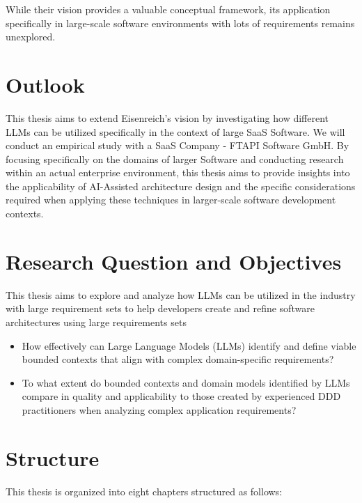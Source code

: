 While their vision provides a valuable conceptual framework, its application specifically in large-scale software environments with lots of requirements remains unexplored. 

\section{Outlook}
This thesis aims to extend Eisenreich's vision by investigating how different LLMs can be utilized specifically in the context of large SaaS Software. We will conduct an empirical study with a SaaS Company - FTAPI Software GmbH. By focusing specifically on the domains of larger Software and conducting research within an actual enterprise environment, this thesis aims to provide insights into the applicability of AI-Assisted architecture design and the specific considerations required when applying these techniques in larger-scale software development contexts.

\section{Research Question and Objectives}

This thesis aims to explore and analyze how LLMs can be utilized in the industry with large requirement sets to help developers create and refine software architectures using large requirements sets

\begin{itemize}
    \item How effectively can Large Language Models (LLMs) identify and define 
    viable bounded contexts that align with complex domain-specific requirements?
    \item To what extent do bounded contexts and domain models identified by LLMs compare in quality and applicability to those created by experienced DDD practitioners when analyzing complex application requirements?
\end{itemize}

\section{Structure}

This thesis is organized into eight chapters structured as follows:

